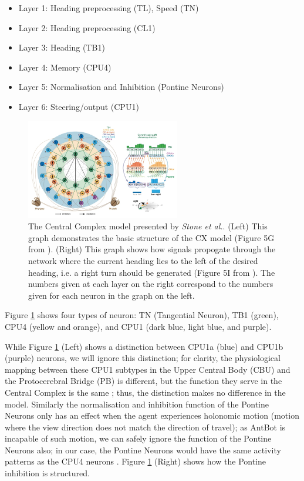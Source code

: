 \documentclass[a4paper,11pt,twoside,openright]{article}
\begin{document}
\begin{itemize}
\item{Layer 1: Heading preprocessing (TL), Speed (TN)}
\item{Layer 2: Heading preprocessing (CL1)}
\item{Layer 3: Heading (TB1)}
\item{Layer 4: Memory (CPU4)}
\item{Layer 5: Normalisation and Inhibition (Pontine Neurons)}
\item{Layer 6: Steering/output (CPU1)}
\end{itemize}

\begin{figure}[h!]
  \centering
  \includegraphics[width=0.6\textwidth]{StoneCXModel}
  \caption{\label{fig:cx} The Central Complex model presented by
    \textit{Stone et al.}. (Left) This graph demonstrates the basic structure of
    the CX model (Figure 5G from \cite{Stone2017}).
    (Right) This graph shows how signals propogate through the network where the
    current heading lies to the left of the desired heading, i.e. a right turn
    should be generated (Figure 5I from \cite{Stone2017}). The numbers given at
    each layer on the right correspond to the numbers given for each neuron
    in the graph on the left.
  }
\end{figure}

Figure \ref{fig:cx} shows four types of neuron: TN (Tangential Neuron), TB1
(green), CPU4 (yellow and orange), and CPU1 (dark blue, light blue, and purple).
\newline
\par

While Figure \ref{fig:cx} (Left) shows a distinction between CPU1a (blue) and
CPU1b (purple) neurons, we will ignore this distinction; for clarity, the
physiological mapping between these CPU1 subtypes in the Upper Central Body (CBU)
and the Protocerebral Bridge (PB) is different, but the function they serve in
the Central Complex is the same \cite{Stone2017}; thus, the distinction makes
no difference in the model. Similarly the normalisation and inhibition function
of the Pontine Neurons only has an effect when the agent experiences holonomic
motion (motion where the view direction does not match the direction of travel);
as AntBot is incapable of such motion, we can safely ignore the function of
the Pontine Neurons also; in our case, the Pontine Neurons would have the
same activity patterns as the CPU4 neurons \cite{Stone2017}. Figure \ref{fig:cx}
(Right) shows how the Pontine inhibition is structured.
\newline
\par
\end{document}
